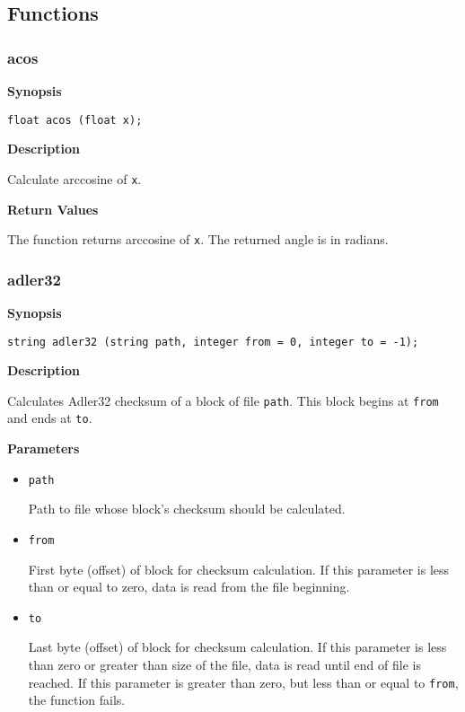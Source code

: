 \documentclass[a4paper, 10pt, titlepage]{article}
\begin{document}
\subsection{Functions}

\subsubsection{acos}

\textbf{Synopsis}

\begin{verbatim}
float acos (float x);
\end{verbatim}

\textbf{Description}

Calculate arccosine of \texttt{x}.

\textbf{Return Values}

The function returns arccosine of \texttt{x}. The returned angle is in radians.

\subsubsection{adler32}

\textbf{Synopsis}

\begin{verbatim}
string adler32 (string path, integer from = 0, integer to = -1);
\end{verbatim}

\textbf{Description}

Calculates Adler32 checksum of a block of file \texttt{path}. This block begins at \texttt{from} and ends at \texttt{to}.

\textbf{Parameters}

\begin{itemize}
\item \texttt{path}

Path to file whose block's checksum should be calculated.

\item \texttt{from}

First byte (offset) of block for checksum calculation. If this parameter is less than or equal to zero, data is read from the file beginning.

\item \texttt{to}

Last byte (offset) of block for checksum calculation. If this parameter is less than zero or greater than size of the file, data is read until end of file is reached. If this parameter is greater than zero, but less than or equal to \texttt{from}, the function fails.
\end{itemize}
\end{document}
